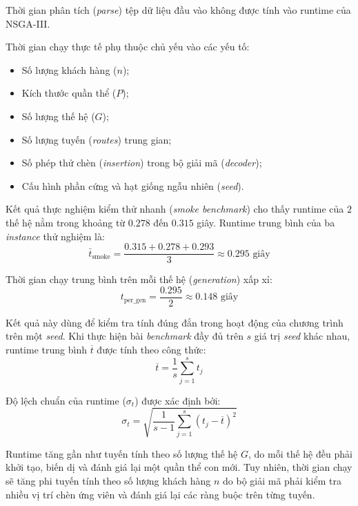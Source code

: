 \documentclass{article}
\begin{document}
Thời gian phân tích (\textit{parse}) tệp dữ liệu đầu vào không được tính vào runtime của NSGA-III.

Thời gian chạy thực tế phụ thuộc chủ yếu vào các yếu tố:
\begin{itemize}
    \item Số lượng khách hàng ($n$);
    \item Kích thước quần thể ($P$);
    \item Số lượng thế hệ ($G$);
    \item Số lượng tuyến (\textit{routes}) trung gian;
    \item Số phép thử chèn (\textit{insertion}) trong bộ giải mã (\textit{decoder});
    \item Cấu hình phần cứng và hạt giống ngẫu nhiên (\textit{seed}).
\end{itemize}

Kết quả thực nghiệm kiểm thử nhanh (\textit{smoke benchmark}) cho thấy runtime của $2$ thế hệ nằm trong khoảng từ $0.278$ đến $0.315$ giây. Runtime trung bình của ba \textit{instance} thử nghiệm là:
\begin{equation}
    \bar{t}_{\text{smoke}} = \frac{0.315 + 0.278 + 0.293}{3} \approx 0.295 \text{ giây}
\end{equation}

Thời gian chạy trung bình trên mỗi thế hệ (\textit{generation}) xấp xỉ:
\begin{equation}
    t_{\text{per\_gen}} = \frac{0.295}{2} \approx 0.148 \text{ giây}
\end{equation}

Kết quả này dùng để kiểm tra tính đúng đắn trong hoạt động của chương trình trên một \textit{seed}. Khi thực hiện bài \textit{benchmark} đầy đủ trên $s$ giá trị \textit{seed} khác nhau, runtime trung bình $\overline{t}$ được tính theo công thức:
\begin{equation}
    \overline{t} = \frac{1}{s} \sum_{j=1}^{s} t_j
\end{equation}

Độ lệch chuẩn của runtime ($\sigma_t$) được xác định bởi:
\begin{equation}
    \sigma_t = \sqrt{ \frac{1}{s - 1} \sum_{j=1}^{s} (t_j - \overline{t})^2 }
\end{equation}

Runtime tăng gần như tuyến tính theo số lượng thế hệ $G$, do mỗi thế hệ đều phải khởi tạo, biến dị và đánh giá lại một quần thể con mới. Tuy nhiên, thời gian chạy sẽ tăng phi tuyến tính theo số lượng khách hàng $n$ do bộ giải mã phải kiểm tra nhiều vị trí chèn ứng viên và đánh giá lại các ràng buộc trên từng tuyến.
\end{document}
